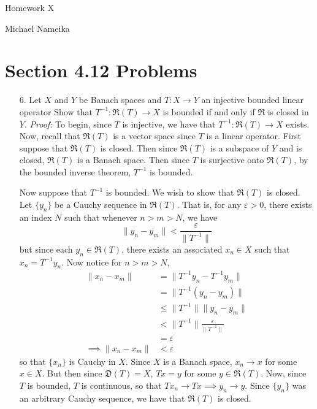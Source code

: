 \documentclass{article}
\begin{document}
\begin{center}
    {\Huge Homework X}
    \vspace{0.5cm}

    {\Large Michael Nameika}
\end{center}


\section*{Section 4.12 Problems}
\begin{itemize}
    \item[6.] Let $X$ and $Y$ be Banach spaces and $T: X \to Y$ an injective bounded linear operator Show that $T^{-1}: \mathfrak{R}(T) \to X$ is bounded if and only if $\mathfrak{R}$ is closed in $Y$.
    \newline\newline
    \textit{Proof:} To begin, since $T$ is injective, we have that $T^{-1}: \mathfrak{R}(T) \to X$ exists. Now, recall that $\mathfrak{R}(T)$ is a vector space since $T$ is a linear operator. First suppose that $\mathfrak{R}(T)$ is closed. Then since $\mathfrak{R}(T)$ is a subspace of $Y$ and is closed, $\mathfrak{R}(T)$ is a Banach space. Then since $T$ is surjective onto $\mathfrak{R}(T)$, by the bounded inverse theorem, $T^{-1}$ is bounded. 
    
    Now suppose that $T^{-1}$ is bounded. We wish to show that $\mathfrak{R}(T)$ is closed. Let $\{y_n\}$ be a Cauchy sequence in $\mathfrak{R}(T)$. That is, for any $\varepsilon > 0$, there exists an index $N$ such that whenever $n>m>N$, we have 
    \[\|y_n - y_m\| < \frac{\varepsilon}{\|T^{-1}\|}\]
    but since each $y_n \in \mathfrak{R}(T)$, there exists an associated $x_n \in X$ such that $x_n = T^{-1}y_n$. Now notice for $n > m > N$,
    \begin{align*}
        \|x_n - x_m\| &= \|T^{-1}y_n - T^{-1}y_m\|\\
        &= \|T^{-1}(y_n - y_m)\|\\
        &\leq \|T^{-1}\|\|y_n - y_m\|\\
        &< \|T^{-1}\|\frac{\varepsilon}{\|T^{-1}\|}\\
        &= \varepsilon\\
        \implies \|x_n - x_m\| &< \varepsilon
    \end{align*}
    so that $\{x_n\}$ is Cauchy in $X$. Since $X$ is a Banach space, $x_n \to x$ for some $x \in X$. But then since $\mathfrak{D}(T) = X$, $Tx = y$ for some $y \in \mathfrak{R}(T)$. Now, since $T$ is bounded, $T$ is continuous, so that $Tx_n \to Tx \implies y_n \to y$. Since $\{y_n\}$ was an arbitrary Cauchy sequence, we have that $\mathfrak{R}(T)$ is closed. 


\end{itemize}
\end{document}
